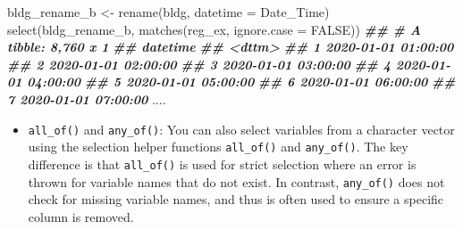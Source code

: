 \documentclass[
]{book}
\newenvironment{Shaded}{\begin{snugshade}}{\end{snugshade}}
\newcommand{\AttributeTok}[1]{\textcolor[rgb]{0.77,0.63,0.00}{#1}}
\newcommand{\ConstantTok}[1]{\textcolor[rgb]{0.00,0.00,0.00}{#1}}
\newcommand{\DocumentationTok}[1]{\textcolor[rgb]{0.56,0.35,0.01}{\textbf{\textit{#1}}}}
\newcommand{\FunctionTok}[1]{\textcolor[rgb]{0.00,0.00,0.00}{#1}}
\newcommand{\NormalTok}[1]{#1}
\newcommand{\OtherTok}[1]{\textcolor[rgb]{0.56,0.35,0.01}{#1}}
\newcommand{\StringTok}[1]{\textcolor[rgb]{0.31,0.60,0.02}{#1}}
\providecommand{\tightlist}{%
  \setlength{\itemsep}{0pt}\setlength{\parskip}{0pt}}
\begin{document}
\begin{Shaded}
\begin{Highlighting}[]
\NormalTok{bldg\_rename\_b }\OtherTok{\textless{}{-}} \FunctionTok{rename}\NormalTok{(bldg, }\StringTok{\textasciigrave{}}\AttributeTok{datetime}\StringTok{\textasciigrave{}} \OtherTok{=} \StringTok{\textasciigrave{}}\AttributeTok{Date\_Time}\StringTok{\textasciigrave{}}\NormalTok{)}
\FunctionTok{select}\NormalTok{(bldg\_rename\_b, }\FunctionTok{matches}\NormalTok{(reg\_ex, }\AttributeTok{ignore.case =} \ConstantTok{FALSE}\NormalTok{))}
\DocumentationTok{\#\# \# A tibble: 8,760 x 1}
\DocumentationTok{\#\#    datetime           }
\DocumentationTok{\#\#    \textless{}dttm\textgreater{}             }
\DocumentationTok{\#\#  1 2020{-}01{-}01 01:00:00}
\DocumentationTok{\#\#  2 2020{-}01{-}01 02:00:00}
\DocumentationTok{\#\#  3 2020{-}01{-}01 03:00:00}
\DocumentationTok{\#\#  4 2020{-}01{-}01 04:00:00}
\DocumentationTok{\#\#  5 2020{-}01{-}01 05:00:00}
\DocumentationTok{\#\#  6 2020{-}01{-}01 06:00:00}
\DocumentationTok{\#\#  7 2020{-}01{-}01 07:00:00}
\NormalTok{....}
\end{Highlighting}
\end{Shaded}

\begin{itemize}
\tightlist
\item
  \texttt{all\_of()} and \texttt{any\_of()}: You can also select variables from a character vector using the selection helper functions \texttt{all\_of()} and \texttt{any\_of()}. The key difference is that \texttt{all\_of()} is used for strict selection where an error is thrown for variable names that do not exist. In contrast, \texttt{any\_of()} does not check for missing variable names, and thus is often used to ensure a specific column is removed.
\end{itemize}
\end{document}
